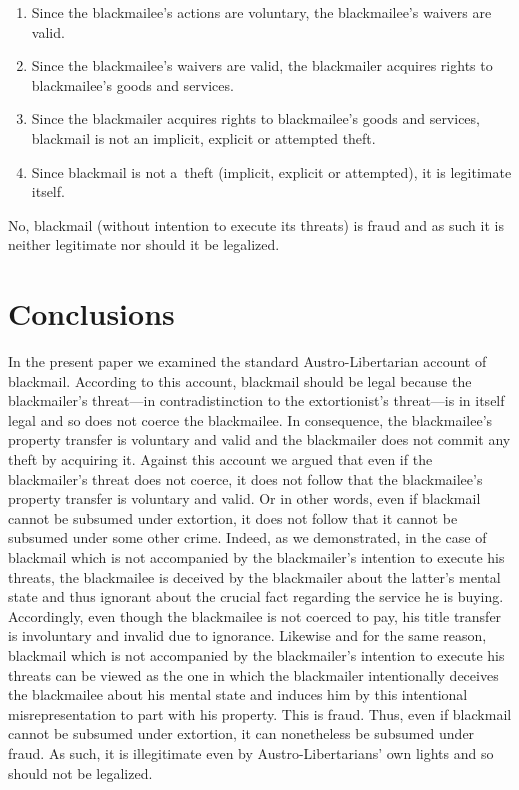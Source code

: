 {\begin{enumerate}
\item Since the blackmailee's actions are voluntary, the blackmailee's waivers are valid.

\item Since the blackmailee's waivers are valid, the blackmailer acquires rights to blackmailee's goods and services.

\item Since the blackmailer acquires rights to blackmailee's goods and services, blackmail is not an implicit, explicit or attempted theft.

\item Since blackmail is not a~theft (implicit, explicit or attempted), it is legitimate itself.

\end{enumerate}

No, blackmail (without intention to execute its threats) is fraud and as such it is neither legitimate nor should it be legalized.



\section{Conclusions}

In the present paper we examined the standard Austro-Libertarian account of blackmail. According to this account, blackmail should be legal because the blackmailer's threat---in contradistinction to the extortionist's threat---is in itself legal and so does not coerce the blackmailee. In consequence, the blackmailee's property transfer is voluntary and valid and the blackmailer does not commit any theft by acquiring it. Against this account we argued that even if the blackmailer's threat does not coerce, it does not follow that the blackmailee's property transfer is voluntary and valid. Or in other words, even if blackmail cannot be subsumed under extortion, it does not follow that it cannot be subsumed under some other crime. Indeed, as we demonstrated, in the case of blackmail which is not accompanied by the blackmailer's intention to execute his threats, the blackmailee is deceived by the blackmailer about the latter's mental state and thus ignorant about the crucial fact regarding the service he is buying. Accordingly, even though the blackmailee is not coerced to pay, his title transfer is involuntary and invalid due to ignorance. Likewise and for the same reason, blackmail which is not accompanied by the blackmailer's intention to execute his threats can be viewed as the one in which the blackmailer intentionally deceives the blackmailee about his mental state and induces him by this intentional misrepresentation to part with his property. This is fraud. Thus, even if blackmail cannot be subsumed under extortion, it can nonetheless be subsumed under fraud. As such, it is illegitimate even by Austro-Libertarians' own lights and so should not be legalized.



}
